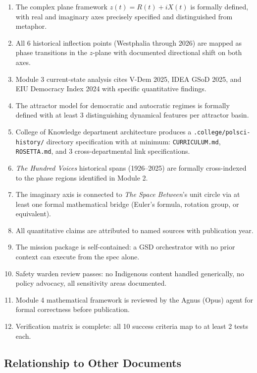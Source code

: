 \documentclass[11pt,letterpaper]{article}
\begin{document}
\begin{enumerate}
  \item The complex plane framework $z(t) = R(t) + iX(t)$ is formally defined, with real and imaginary axes precisely specified and distinguished from metaphor.
  \item All 6 historical inflection points (Westphalia through 2026) are mapped as phase transitions in the $z$-plane with documented directional shift on both axes.
  \item Module 3 current-state analysis cites V-Dem 2025, IDEA GSoD 2025, and EIU Democracy Index 2024 with specific quantitative findings.
  \item The attractor model for democratic and autocratic regimes is formally defined with at least 3 distinguishing dynamical features per attractor basin.
  \item College of Knowledge department architecture produces a \texttt{.college/polsci-history/} directory specification with at minimum: \texttt{CURRICULUM.md}, \texttt{ROSETTA.md}, and 3 cross-departmental link specifications.
  \item \textit{The Hundred Voices} historical spans (1926--2025) are formally cross-indexed to the phase regions identified in Module 2.
  \item The imaginary axis is connected to \textit{The Space Between}'s unit circle via at least one formal mathematical bridge (Euler's formula, rotation group, or equivalent).
  \item All quantitative claims are attributed to named sources with publication year.
  \item The mission package is self-contained: a GSD orchestrator with no prior context can execute from the spec alone.
  \item Safety warden review passes: no Indigenous content handled generically, no policy advocacy, all sensitivity areas documented.
  \item Module 4 mathematical framework is reviewed by the Agnus (Opus) agent for formal correctness before publication.
  \item Verification matrix is complete: all 10 success criteria map to at least 2 tests each.
\end{enumerate}

\subsection{Relationship to Other Documents}
\end{document}
